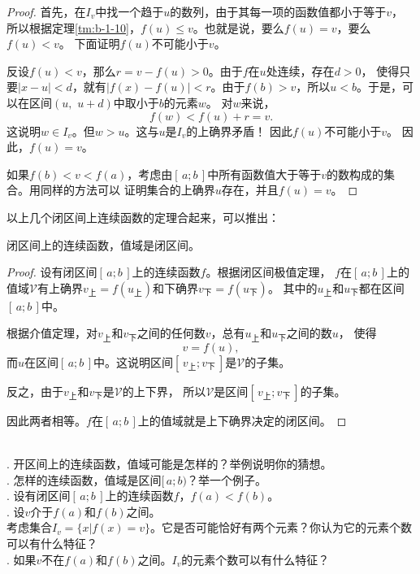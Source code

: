 \documentclass[12pt,UTF8]{ctexbook}
\begin{document}
\begin{appendix}
\begin{proof}
    首先，在$I_v$中找一个趋于$u$的数列，由于其每一项的函数值都小于等于$v$，
    所以根据定理\ref{tm:b-1-10}，$f(u)\leqslant v$。也就是说，要么$f(u) = v$，要么$f(u) < v$。
    下面证明$f(u)$不可能小于$v$。

    反设$f(u)< v$，那么$r = v - f(u) > 0$。由于$f$在$u$处连续，存在$d>0$，
    使得只要$|x - u| < d$，就有$|f(x) - f(u)| < r$。由于$f(b) > v$，所以$u < b$。于是，可以在区间$(u, \,\, u+d)$中取小于$b$的元素$w$。
    对$w$来说，
    $$ f(w) < f(u) + r = v.$$
    这说明$w\in I_v$。但$w>u$。这与$u$是$I_v$的上确界矛盾！
    因此$f(u)$不可能小于$v$。
    因此，$f(u) = v$。

    如果$f(b) < v < f(a)$，考虑由$[\,a;b\,]$中所有函数值大于等于$v$的数构成的集合。用同样的方法可以
    证明集合的上确界$u$存在，并且$f(u) = v$。

\end{proof}

以上几个闭区间上连续函数的定理合起来，可以推出：
\begin{tm}
    闭区间上的连续函数，值域是闭区间。
\end{tm}
\begin{proof}
    设有闭区间$[\,a;b\,]$上的连续函数$f$。根据闭区间极值定理，
    $f$在$[\,a;b\,]$上的值域$\mathcal{V}$有上确界$v_{\text{上}} = f(u_{\text{上}})$和下确界$v_{\text{下}} = f(u_{\text{下}})$。
    其中的$u_{\text{上}}$和$u_{\text{下}}$都在区间$[\,a;b\,]$中。

    根据介值定理，对$v_{\text{上}}$和$v_{\text{下}}$之间的任何数$v$，总有$u_{\text{上}}$和$u_{\text{下}}$之间的数$u$，
    使得
    $$ v = f(u),$$
    而$u$在区间$[\,a;b\,]$中。这说明区间$[\,v_{\text{上}};v_{\text{下}}\,]$是$\mathcal{V}$的子集。

    反之，由于$v_{\text{上}}$和$v_{\text{下}}$是$\mathcal{V}$的上下界，
    所以$\mathcal{V}$是区间$[\,v_{\text{上}};v_{\text{下}}\,]$的子集。

    因此两者相等。$f$在$[\,a;b\,]$上的值域就是上下确界决定的闭区间。

\end{proof}

\begin{sk}
    \mbox{} \\
    . 开区间上的连续函数，值域可能是怎样的？举例说明你的猜想。\\
    . 怎样的连续函数，值域是区间$[\,a; b)$？举一个例子。\\
    . 设有闭区间$[\,a;b\,]$上的连续函数$f$，$f(a) < f(b)$。\\
    . 设$v$介于$f(a)$和$f(b)$之间。\\
    考虑集合$I_v = \{x | f(x) = v\}$。它是否可能恰好有两个元素？你认为它的元素个数可以有什么特征？\\
    . 如果$v$不在$f(a)$和$f(b)$之间。$I_v$的元素个数可以有什么特征？
\end{sk}


\end{appendix}
\end{document}
